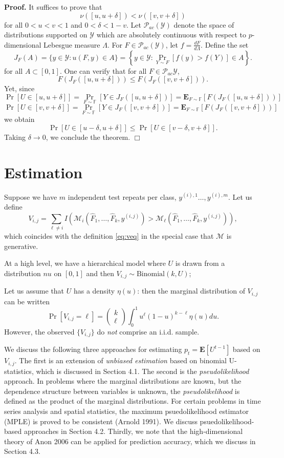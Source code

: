 \documentclass{article}
\newcommand{\E}{\textbf{E}}
\begin{document}
\noindent\textbf{Proof.}
It suffices to prove that
\[
\nu([u, u + \delta]) < \nu([v, v + \delta])
\]
for all $0 < u < v < 1$ and $0 < \delta < 1-v$.
Let $\mathcal{P}_{ac}(\mathcal{Y})$ denote the space of distributions supported on $\mathcal{Y}$ which are
absolutely continuous with respect to $p$-dimensional Lebesgue measure $\Lambda$.
For $F \in \mathcal{P}_{ac}(\mathcal{Y})$, let $f = \frac{dF}{d\Lambda}$. Define the set 
\[
J_F(A) =\{y \in \mathcal{Y}: u(F, y) \in A\} = \left\{y \in \mathcal{Y}: \Pr_{Y \sim F}[f(y) > f(Y)] \in A\right\}.
\]
for all $A \subset [0, 1].$
One can verify that for all $F \in \mathcal{P}_{ac}\mathcal{Y}$,
\[
F(J_F([u, u + \delta])) \leq F(J_F([v, v + \delta])).
\]
Yet, since
\[
\Pr[U \in [u, u + \delta]] = \Pr_{F \sim \mathbb{F}}[Y \in J_F([u, u + \delta])] = \E_{F \sim \mathbb{F}}[F(J_F([u, u + \delta]))]
\]
\[
\Pr[U \in [v, v + \delta]] = \Pr_{F \sim \mathbb{F}}[Y \in J_F([v, v + \delta])] = \E_{F \sim \mathbb{F}}[F(J_F([v, v + \delta]))]
\]
we obtain
\[
\Pr[U \in [u-\delta, u + \delta]] \leq \Pr[U \in [v - \delta, v + \delta]].
\]
Taking $\delta \to 0$, we conclude the theorem. $\Box$\newline

\section{Estimation}

Suppose we have $m$ independent test repeats per class, $y^{(i),1}\hdots, y^{(i), m}$.
Let us define
\[
V_{i,j} = \sum_{\ell\neq i} I(\mathcal{M}_i(\hat{F}_1,\hdots, \hat{F}_k, y^{(i, j)})  > \mathcal{M}_\ell(\hat{F}_1,\hdots, \hat{F}_k, y^{(i, j)})),
\]
which coincides with the definition \eqref{eq:veq} in the special case that $\mathcal{M}$ is generative.

At a high level, we have a hierarchical model where $U$ is drawn from a distribution $nu$ on $[0, 1]$
and then $V_{i, j} \sim \text{Binomial}(k, U)$;

Let us assume that $U$ has a density $\eta(u)$: then the marginal distribution of $V_{i, j}$ can be written
\[
\Pr[V_{i,j} = \ell] = \begin{pmatrix}
k \\ \ell
\end{pmatrix}
\int_0^1 u^\ell (1-u)^{k-\ell} \eta(u) du.
\]
However, the observed $\{V_{i, j}\}$ do \emph{not} comprise an i.i.d. sample.

We discuss the following three approaches for estimating $p_t =
\E[U^{t-1}]$ based on $V_{i, j}$.  The first is an extension of \emph{unbiased
  estimation} based on binomial U-statistics, which is discussed in
Section 4.1.  The second is the \emph{pseudolikelihood} approach.  In
problems where the marginal distributions are known, but the
dependence structure between variables is unknown, the
\emph{pseudolikelihood} is defined as the product of the marginal
distributions.  For certain problems in time series analysis and
spatial statistics, the maximum psuedolikelihood estimator (MPLE) is
proved to be consistent (Arnold 1991).  We discuss psuedolikelihood-based
approaches in Section 4.2.  Thirdly, we note that the high-dimensional
theory of Anon 2006 can be applied for prediction accuracy, which we discuss in Section 4.3.
\end{document}
